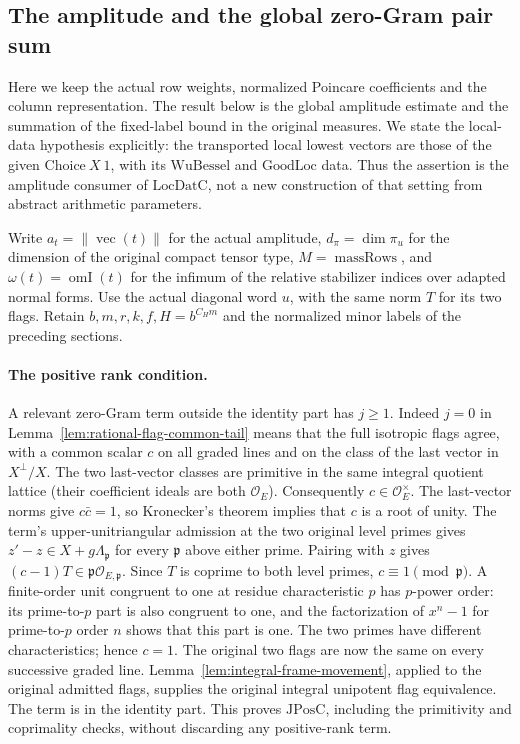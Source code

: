 \subsection{The amplitude and the global zero-Gram pair sum}
\label{sec:flag-global-amplitude}

Here we keep the actual row weights, normalized Poincare coefficients
and the column representation. The result below is the global
amplitude estimate and the summation of the fixed-label bound in the
original measures. We state the local-data hypothesis explicitly:
the transported local lowest vectors are those of the given
\(\mathrm{Choice}\ X\ 1\), with its \(\mathrm{WuBessel}\) and
\(\mathrm{GoodLoc}\) data. Thus the assertion is the amplitude
consumer of \(\mathrm{LocDatC}\), not a new construction of that
setting from abstract arithmetic parameters.

Write \(a_t=\|\operatorname{vec}(t)\|\) for the actual amplitude,
\(d_\pi=\dim\pi_u\) for the dimension of the original compact tensor
type, \(M=\operatorname{massRows}\), and \(\omega(t)=\operatorname{omI}(t)\)
for the infimum of the relative stabilizer indices over adapted normal
forms. Use the actual diagonal word \(u\), with the same norm \(T\)
for its two flags. Retain \(b,m,r,k,f,H=b^{C_Hm}\) and the
normalized minor labels of the preceding sections.

\paragraph{The positive rank condition.}
A relevant zero-Gram term outside the identity part has \(j\ge1\).
Indeed \(j=0\) in Lemma~\ref{lem:rational-flag-common-tail} means that
the full isotropic flags agree, with a common scalar \(c\) on all
graded lines and on the class of the last vector in \(X^\perp/X\).
The two last-vector classes are primitive in the same integral
quotient lattice (their coefficient ideals are both \(\mathcal O_E\)).
Consequently \(c\in\mathcal O_E^\times\). The last-vector norms give
\(c\bar c=1\), so Kronecker's theorem implies that \(c\) is a root of
unity. The term's upper-unitriangular admission at the two original
level primes gives \(z'-z\in X+g\Lambda_{\mathfrak p}\) for every
\(\mathfrak p\) above either prime. Pairing with \(z\) gives
\((c-1)T\in\mathfrak p\mathcal O_{E,\mathfrak p}\).
Since \(T\) is coprime to both level primes, \(c\equiv1\pmod{\mathfrak p}\).
A finite-order unit congruent to one at residue characteristic \(p\)
has \(p\)-power order: its prime-to-\(p\) part is also congruent to one,
and the factorization of \(x^n-1\) for prime-to-\(p\) order \(n\) shows
that this part is one. The two primes have different characteristics;
hence \(c=1\). The original two flags are now the same on every
successive graded line. Lemma~\ref{lem:integral-frame-movement}, applied
to the original admitted flags, supplies the original integral
unipotent flag equivalence. The term is in the identity part.
This proves \(\mathrm{JPosC}\), including the primitivity and
coprimality checks, without discarding any positive-rank term.

